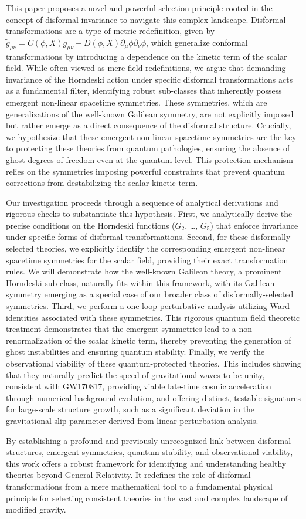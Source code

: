 \documentclass[twocolumn]{aastex631}
\begin{document}
This paper proposes a novel and powerful selection principle rooted in the concept of disformal invariance to navigate this complex landscape. Disformal transformations are a type of metric redefinition, given by $\tilde{g}_{\mu\nu} = C(\phi, X) g_{\mu\nu} + D(\phi, X) \partial_\mu \phi \partial_\nu \phi$, which generalize conformal transformations by introducing a dependence on the kinetic term of the scalar field. While often viewed as mere field redefinitions, we argue that demanding invariance of the Horndeski action under specific disformal transformations acts as a fundamental filter, identifying robust sub-classes that inherently possess emergent non-linear spacetime symmetries. These symmetries, which are generalizations of the well-known Galilean symmetry, are not explicitly imposed but rather emerge as a direct consequence of the disformal structure. Crucially, we hypothesize that these emergent non-linear spacetime symmetries are the key to protecting these theories from quantum pathologies, ensuring the absence of ghost degrees of freedom even at the quantum level. This protection mechanism relies on the symmetries imposing powerful constraints that prevent quantum corrections from destabilizing the scalar kinetic term.

Our investigation proceeds through a sequence of analytical derivations and rigorous checks to substantiate this hypothesis. First, we analytically derive the precise conditions on the Horndeski functions ($G_2$, \dots, $G_5$) that enforce invariance under specific forms of disformal transformations. Second, for these disformally-selected theories, we explicitly identify the corresponding emergent non-linear spacetime symmetries for the scalar field, providing their exact transformation rules. We will demonstrate how the well-known Galileon theory, a prominent Horndeski sub-class, naturally fits within this framework, with its Galilean symmetry emerging as a special case of our broader class of disformally-selected symmetries. Third, we perform a one-loop perturbative analysis utilizing Ward identities associated with these symmetries. This rigorous quantum field theoretic treatment demonstrates that the emergent symmetries lead to a non-renormalization of the scalar kinetic term, thereby preventing the generation of ghost instabilities and ensuring quantum stability. Finally, we verify the observational viability of these quantum-protected theories. This includes showing that they naturally predict the speed of gravitational waves to be unity, consistent with GW170817, providing viable late-time cosmic acceleration through numerical background evolution, and offering distinct, testable signatures for large-scale structure growth, such as a significant deviation in the gravitational slip parameter derived from linear perturbation analysis.

By establishing a profound and previously unrecognized link between disformal structures, emergent symmetries, quantum stability, and observational viability, this work offers a robust framework for identifying and understanding healthy theories beyond General Relativity. It redefines the role of disformal transformations from a mere mathematical tool to a fundamental physical principle for selecting consistent theories in the vast and complex landscape of modified gravity.
\end{document}
